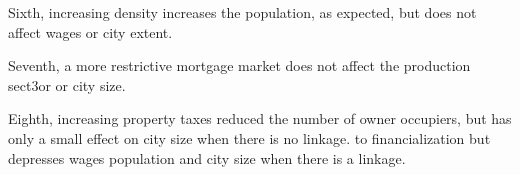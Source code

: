 Sixth, increasing density increases the population, as expected, but does not affect wages or city extent.

Seventh, a more restrictive mortgage market does not affect the production sect3or or city size.

Eighth, increasing property taxes reduced the number of owner occupiers, but has only a small effect on city size when there is no linkage. to financialization but depresses wages population and city size when there is a linkage. 


